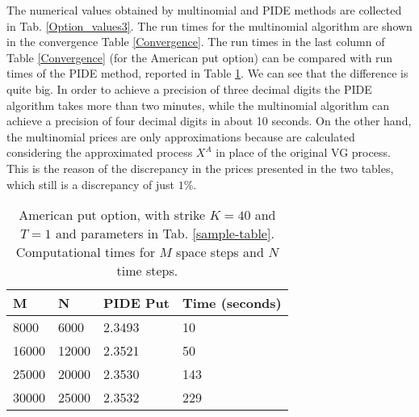 The numerical values obtained by multinomial and PIDE methods are collected in Tab. \ref{Option_values3}.
The run times for the multinomial algorithm are shown in the convergence Table \ref{Convergence}.
The run times in the last column of Table \ref{Convergence} (for the American put option) can be compared with run times of the PIDE method, reported in Table \ref{PIDE_times}. 
We can see that the difference is quite big. In order to achieve a precision of three decimal digits the PIDE algorithm takes more than two minutes, while the multinomial algorithm
can achieve a precision of four decimal digits in about 10 seconds. 
On the other hand, the multinomial prices are only approximations because are calculated considering the approximated process $X^A$ in place of the original VG process. 
This is the reason of the discrepancy in the prices presented in the two tables, which still is a discrepancy of just $1\%$.
\begin{table}[ht]
\centering
{\begin{tabular}{llll} 
\toprule
 M & N & PIDE Put & Time (seconds) \\
\midrule
 8000  & 6000  & 2.3493 & 10 \\
 16000 & 12000 & 2.3521 & 50 \\
 25000 & 20000 & 2.3530 & 143 \\
 30000 & 25000 & 2.3532 & 229 \\
\bottomrule
\end{tabular}}
\caption{American put option, with strike $K=40$ and $T=1$ and parameters in Tab. \ref{sample-table}. Computational times for $M$ space steps and $N$ time steps.}
\label{PIDE_times}
\end{table}

